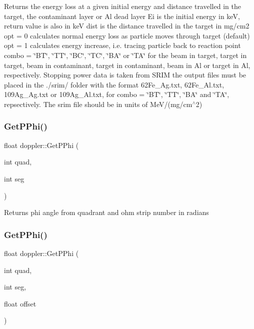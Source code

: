 Returns the energy loss at a given initial energy and distance travelled in the target, the contaminant layer or Al dead layer Ei is the initial energy in keV, return value is also in keV dist is the distance travelled in the target in mg/cm2 opt = 0 calculates normal energy loss as particle moves through target (default) opt = 1 calculates energy increase, i.\+e. tracing particle back to reaction point combo = \char`\"{}\+B\+T\char`\"{}, \char`\"{}\+T\+T\char`\"{}, \char`\"{}\+B\+C\char`\"{}, \char`\"{}\+T\+C\char`\"{}, \char`\"{}\+B\+A\char`\"{} or \char`\"{}\+T\+A\char`\"{} for the beam in target, target in target, beam in contaminant, target in contaminant, beam in Al or target in Al, respectively. Stopping power data is taken from S\+R\+IM the output files must be placed in the \textquotesingle{}./srim/\textquotesingle{} folder with the format 62\+Fe\+\_\+Ag.\+txt, 62\+Fe\+\_\+\+Al.\+txt, 109\+Ag\+\_\+Ag.\+txt or 109\+Ag\+\_\+\+Al.\+txt, for combo = \char`\"{}\+B\+T\char`\"{}, \char`\"{}\+T\+T\char`\"{}, \char`\"{}\+B\+A\char`\"{} and \char`\"{}\+T\+A\char`\"{}, repsectively. The srim file should be in units of Me\+V/(mg/cm$^\wedge$2) \mbox{\label{classdoppler_a0f57a8f4a8c369c14d52e62dd3833f2e}} 
\subsubsection{\texorpdfstring{Get\+P\+Phi()}{GetPPhi()}\hspace{0.1cm}{\footnotesize\ttfamily [1/2]}}
{\footnotesize\ttfamily float doppler\+::\+Get\+P\+Phi (\begin{DoxyParamCaption}\item[{int}]{quad,  }\item[{int}]{seg }\end{DoxyParamCaption})}

Returns phi angle from quadrant and ohm strip number in radians \mbox{\label{classdoppler_ac8f059cc77214a954be534a85c748a3c}} 
\subsubsection{\texorpdfstring{Get\+P\+Phi()}{GetPPhi()}\hspace{0.1cm}{\footnotesize\ttfamily [2/2]}}
{\footnotesize\ttfamily float doppler\+::\+Get\+P\+Phi (\begin{DoxyParamCaption}\item[{int}]{quad,  }\item[{int}]{seg,  }\item[{float}]{offset }\end{DoxyParamCaption})}

